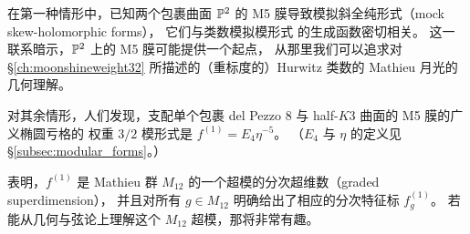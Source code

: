 

在第一种情形中，已知两个包裹曲面 $\mathbb{P}^2$ 的 M5 膜导致模拟斜全纯形式（mock skew-holomorphic forms），
它们与类数模拟模形式  的生成函数密切相关。
这一联系暗示，$\mathbb{P}^2$ 上的 M5 膜可能提供一个起点，
从那里我们可以追求对 \S\ref{ch:moonshineweight32} 所描述的（重标度的）Hurwitz 类数的 Mathieu 月光的几何理解。


对其余情形，人们发现，支配单个包裹 del Pezzo 8 与 half-$K3$ 曲面的 M5 膜的广义椭圆亏格的
权重 $3/2$ 模形式是 $f^{(1)}= E_4\eta^{-5}$。
（$E_4$ 与 $\eta$ 的定义见 \S\ref{subsec:modular_forms}。）

\cite{Cheng:2017dlj} 表明，$f^{(1)}$ 是 Mathieu 群 $M_{12}$ 的一个超模的分次超维数（graded superdimension），
并且对所有 $g\in M_{12}$ 明确给出了相应的分次特征标 $f^{(1)}_g$。
若能从几何与弦论上理解这个 $M_{12}$ 超模，那将非常有趣。


